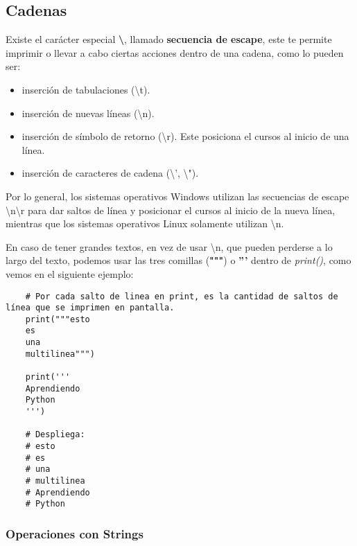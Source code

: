 \subsection{Cadenas}

Existe el carácter especial \textbf{\textbackslash}, llamado \textbf{secuencia de escape}, este te permite imprimir o llevar a cabo ciertas acciones dentro de una cadena, como lo pueden ser:
\begin{itemize}
	\item inserción de tabulaciones (\textbackslash t).
	\item inserción de nuevas líneas (\textbackslash n).
	\item inserción de símbolo de retorno (\textbackslash r). Este posiciona el cursos al inicio de una línea.
	\item inserción de caracteres de cadena (\textbackslash ', \textbackslash ").
\end{itemize}

Por lo general, los sistemas operativos Windows utilizan las secuencias de escape \textbackslash n\textbackslash r para dar saltos de línea y posicionar el cursos al inicio de la nueva línea, mientras que los sistemas operativos Linux solamente utilizan \textbackslash n.

En caso de tener grandes textos, en vez de usar \textbackslash n, que pueden perderse a lo largo del texto, podemos usar las tres comillas (\textbf{"""}) o \textbf{'''} dentro de \textit{print()}, como vemos en el siguiente ejemplo:
\begin{lstlisting}
    # Por cada salto de linea en print, es la cantidad de saltos de línea que se imprimen en pantalla.
    print("""esto
    es
    una
    multilinea""")

    print('''
    Aprendiendo
    Python	
    ''')

    # Despliega:
    # esto
    # es
    # una
    # multilinea
    # Aprendiendo
    # Python
\end{lstlisting}


\subsubsection{Operaciones con Strings}

